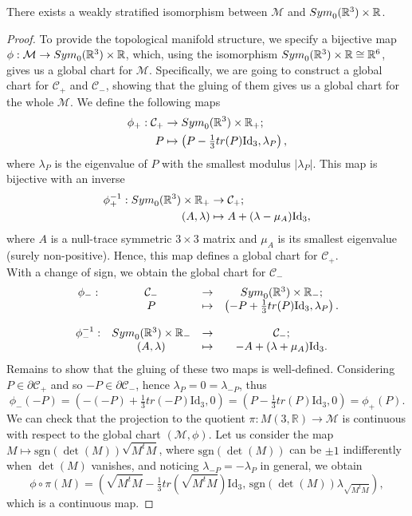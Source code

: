 \documentclass[10pt,a4paper]{amsart}
\newcommand{\M}{\mathcal{M}}
\newcommand{\R}{\mathbb{R}}
\begin{document}
\begin{proposition}
    There exists a weakly stratified isomorphism between $\mathcal{M}$ and ${\rm Sym}_0(\R^3)\times \R$.
\end{proposition}

\begin{proof}
     To provide the topological manifold structure, we specify a bijective map $\phi:\M\to{\rm Sym}_0(\R^3)\times \R$, which, using the isomorphism ${\rm Sym}_0(\R^3)\times \R\cong \R^6$, gives us a global chart for $\M$. Specifically, we are going to construct a global chart for $\mathcal{C}_{+}$ and $\mathcal{C}_-$, showing that the gluing of them gives us a global chart for the whole $\mathcal{M}$. We define the following maps
    \begin{align*}
        \phi_+:\mathcal{C}_{+}&\to {\rm Sym}_0(\R^3)\times \R_+;\\
        P&\mapsto \left(P-\tfrac{1}{3}tr(P)\mathrm{Id}_3, \lambda_P\right),
    \end{align*}
    where $\lambda_P$ is the eigenvalue of $P$ with the smallest modulus $|\lambda_P|$. This map is bijective with an inverse
    \begin{align*}
        \phi_+^{-1}:{\rm Sym}_0(\R^3)\times \R_+&\to\mathcal{C}_{+};\\
        (A,\lambda)&\mapsto A+(\lambda-\mu_A)\mathrm{Id}_3,
    \end{align*}
    where $A$ is a null-trace symmetric $3\times 3$ matrix and $\mu_A$ is its smallest eigenvalue (surely non-positive). Hence, this map defines a global chart for $\mathcal{C}_{+}$.\\
    With a change of sign, we obtain the global chart for $\mathcal{C}_{-}$
    \[\begin{matrix}
        \phi_-:&\mathcal{C}_{-}&\to &{\rm Sym}_0(\R^3)\times \R_-;\\
        &P&\mapsto &\left(-P+\tfrac{1}{3}tr(P)\mathrm{Id}_3, \lambda_P\right).\\
        & & & \\
        \phi_-^{-1}:&{\rm Sym}_0(\R^3)\times \R_-&\to&\mathcal{C}_{-};\\
        &(A,\lambda)&\mapsto& -A+(\lambda+\mu_A)\mathrm{Id}_3.
    \end{matrix}\]
    Remains to show that the gluing of these two maps is well-defined. Considering $P\in\partial\mathcal{C}_{+}$ and so $-P\in\partial\mathcal{C}_{-}$, hence $\lambda_P=0=\lambda_{-P}$, thus
    \[\phi_-(-P)=\left(-(-P)+\tfrac{1}{3}tr(-P)\mathrm{Id}_3,0\right)=\left(P-\tfrac{1}{3}tr(P)\mathrm{Id}_3,0\right)=\phi_+(P).\]
    We can check that the projection to the quotient $\pi:M(3,\R)\to\mathcal{M}$ is continuous with respect to the global chart $(\mathcal{M},\phi)$. Let us consider the map $M\mapsto\mathrm{sgn}(\det(M))\sqrt{M^tM}$, where $\mathrm{sgn}(\det(M))$ can be $\pm1$ indifferently when $\det(M)$ vanishes, and noticing $\lambda_{-P}=-\lambda_P$ in general, we obtain
\begin{equation}
    \phi\circ \pi(M)=\left(\sqrt{M^tM}-\tfrac{1}{3}tr(\sqrt{M^tM})\mathrm{Id}_3,\,\mathrm{sgn}(\det(M))\lambda_{\sqrt{M^tM}}\right),
\end{equation}
    which is a continuous map.


\end{proof}
\end{document}

